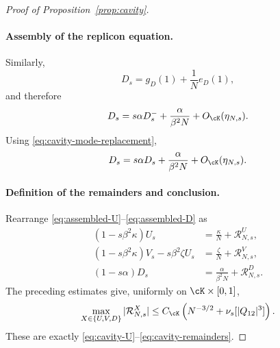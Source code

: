 \begin{proof}[Proof of Proposition~\ref{prop:cavity}]
\paragraph{Assembly of the replicon equation.}

Similarly,
\[
 D_s
 =
 g_D(1)+\frac1N e_D(1),
\]
and therefore
\[
 D_s
 =
 s\alpha D_s^-
 +\frac{\alpha}{\beta^2N}
 +O_{\cK}(\eta_{N,s}).
\]
Using \eqref{eq:cavity-mode-replacement},
\begin{equation}
 D_s
 =
 s\alpha D_s
 +\frac{\alpha}{\beta^2N}
 +O_{\cK}(\eta_{N,s}).
 \label{eq:assembled-D}
\end{equation}

\paragraph{Definition of the remainders and conclusion.}

Rearrange
\eqref{eq:assembled-U}--\eqref{eq:assembled-D} as
\begin{align*}
 (1-s\beta^2\kappa)U_s
 &=
 \frac{\kappa}{N}+\mathcal R^U_{N,s},
 \\
 (1-s\beta^2\kappa)V_s
 -s\beta^2\zeta U_s
 &=
 \frac{\zeta}{N}+\mathcal R^V_{N,s},
 \\
 (1-s\alpha)D_s
 &=
 \frac{\alpha}{\beta^2N}
 +\mathcal R^D_{N,s}.
\end{align*}
The preceding estimates give, uniformly on
$\cK\times[0,1]$,
\[
 \max_{X\in\{U,V,D\}}
 |\mathcal R^X_{N,s}|
 \le
 C_{\cK}
 \left(
 N^{-3/2}+\nu_s[|Q_{12}|^3]
 \right).
\]
These are exactly
\eqref{eq:cavity-U}--\eqref{eq:cavity-remainders}.
\end{proof}

